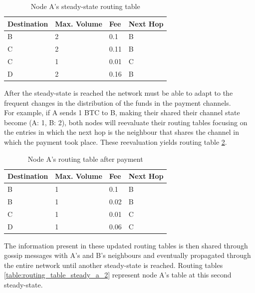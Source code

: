 \begin{table}[H]
\centering
\begin{tabular}{|l|l|l|l|}
\hline
\rowcolor[HTML]{C0C0C0} 
Destination & Max. Volume   & Fee   & Next Hop \\ \hline
B           & 2             & 0.1   & B       \\ \hline
C           & 2             & 0.11  & B       \\ \hline
C           & 1             & 0.01  & C       \\ \hline
D           & 2             & 0.16  & B       \\ \hline
\end{tabular}
\caption{Node A's steady-state routing table}
\label{table:routing_table_steady_a}
\end{table}

After the steady-state is reached the network must be able to adapt to the frequent changes in the distribution of the funds in the payment channels.\\
For example, if A sends 1 BTC to B, making their shared their channel state become (A: 1, B: 2), both nodes will reevaluate their routing tables focusing on the entries in which the next hop is the neighbour that shares the channel in which the payment took place. These reevaluation yields routing table \ref{table:routing_table_payment_a}.

\begin{table}[H]
\centering
\begin{tabular}{|l|l|l|l|}
\hline
\rowcolor[HTML]{C0C0C0} 
Destination & Max. Volume   & Fee   & Next Hop \\ \hline
B           & 1             & 0.1   & B       \\ \hline
B           & 1             & 0.02  & B         \\ \hline
C           & 1             & 0.01  & C       \\ \hline
D           & 1             & 0.06  & C       \\ \hline
\end{tabular}
\caption{Node A's routing table after payment}
\label{table:routing_table_payment_a}
\end{table}

The information present in these updated routing tables is then shared through gossip messages with A's and B's neighbours and eventually propagated through the entire network until another steady-state is reached. Routing tables \ref{table:routing_table_steady_a_2} represent node A's table at this second steady-state.

